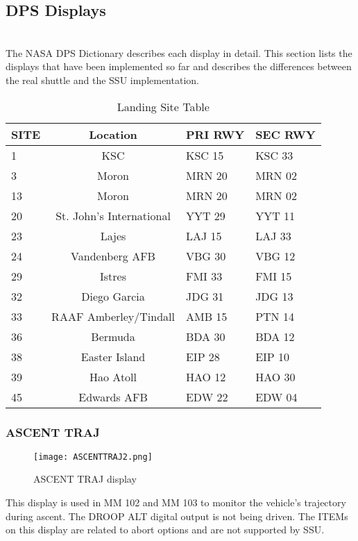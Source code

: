 \documentclass[Space_Shuttle_Ultra_Manual.tex]{subfiles}
\begin{document}
\subsection{DPS Displays}
\begin{multicols*}{2}
\renewcommand{\cfttoctitlefont}{\bf}
\localtableofcontents
\label{sec:dps-displays}
\noindent
\\
The NASA DPS Dictionary describes each display in detail. This section lists the displays that have been implemented so far and describes the differences between the real shuttle and the SSU implementation.

\begin{table*}[tb]
  \centering
  \begin{tabular}{l | c l l}
    \textbf{SITE} & \textbf{Location} & \textbf{PRI RWY} & \textbf{SEC RWY} \\
    \hline
    1 & KSC & KSC 15 & KSC 33 \\
    3 & Moron & MRN 20 & MRN 02 \\
    13 & Moron & MRN 20 & MRN 02 \\
    20 & St. John's International & YYT 29 & YYT 11 \\
    23 & Lajes & LAJ 15 & LAJ 33 \\
    24 & Vandenberg AFB & VBG 30 & VBG 12 \\
    29 & Istres & FMI 33 & FMI 15 \\
    32 & Diego Garcia & JDG 31 & JDG 13 \\
    33 & RAAF Amberley/Tindall & AMB 15 & PTN 14 \\
    36 & Bermuda & BDA 30 & BDA 12 \\
    38 & Easter Island & EIP 28 & EIP 10 \\
    39 & Hao Atoll & HAO 12 & HAO 30 \\
    45 & Edwards AFB & EDW 22 & EDW 04
  \end{tabular}
  \caption{Landing Site Table}
  \label{tab:LandingSites}
\end{table*}

\subsubsection{ASCENT TRAJ}
\begin{figure}[H]
  \texttt{[image: ASCENTTRAJ2.png]}
  \caption{ASCENT TRAJ display}
  \label{fig:ASCENT_TRAJ}
\end{figure}
This display is used in MM 102 and MM 103 to monitor the vehicle's trajectory during ascent. The DROOP ALT digital output is not being driven. The ITEMs on this display are related to abort options and are not supported by SSU.


\end{multicols*}
\end{document}
